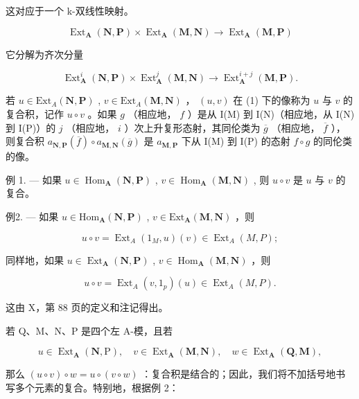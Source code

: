 这对应于一个 k-双线性映射。

\[
\operatorname{Ext} _ {\mathbf {A}} (\mathbf {N}, \mathbf {P}) \times \operatorname{Ext} _ {\mathbf {A}} (\mathbf {M}, \mathbf {N}) \rightarrow \operatorname{Ext} _ {\mathbf {A}} (\mathbf {M}, \mathbf {P})\tag{1}
\]

它分解为齐次分量

\[
\operatorname{Ext} _ {\mathbf {A}} ^ {i} (\mathbf {N}, \mathbf {P}) \times \operatorname{Ext} _ {\mathbf {A}} ^ {j} (\mathbf {M}, \mathbf {N}) \rightarrow \operatorname{Ext} _ {\mathbf {A}} ^ {i + j} (\mathbf {M}, \mathbf {P}).\tag{2}
\]

若 \(u \in \text{Ext}_A(\mathbf{N}, \mathbf{P})\) , \(v \in \text{Ext}_A(\mathbf{M}, \mathbf{N})\) ， \((u, v)\) 在 (1) 下的像称为 \(u\) 与 \(v\) 的复合积，记作 \(u \circ v\) 。如果 \(g\) （相应地， \(f\) ）是从 I(M) 到 I(N)（相应地，从 I(N) 到 I(P)）的 \(j\) （相应地， \(i\) ）次上升复形态射，其同伦类为 \(\overline{g}\) （相应地， \(\overline{f}\) ），则复合积 \(a_{\mathbf{N},\mathbf{P}}(\overline{f}) \circ a_{\mathbf{M},\mathbf{N}}(\overline{g})\) 是 \(a_{\mathbf{M},\mathbf{P}}\) 下从 I(M) 到 I(P) 的态射 \(f \circ g\) 的同伦类的像。

例 1. --- 如果 \(u \in \operatorname{Hom}_{\mathbf{A}}(\mathbf{N}, \mathbf{P})\) , \(v \in \operatorname{Hom}_{\mathbf{A}}(\mathbf{M}, \mathbf{N})\) , 则 \(u \circ v\) 是 \(u\) 与 \(v\) 的复合。

例2. --- 如果 \(u \in \mathrm{Hom}_{\mathbf{A}}(\mathbf{N}, \mathbf{P})\) , \(v \in \mathrm{Ext}_{\mathbf{A}}(\mathbf{M}, \mathbf{N})\) ，则

\[
u \circ v = \operatorname{Ext} _ {A} (1 _ {M}, u) (v) \in \operatorname{Ext} _ {A} (M, P);
\]

同样地，如果 \(u \in \operatorname{Ext}_{\mathbf{A}}(\mathbf{N}, \mathbf{P})\) , \(v \in \operatorname{Hom}_{\mathbf{A}}(\mathbf{M}, \mathbf{N})\) ，则

\[
u \circ v = \operatorname{Ext} _ {A} (v, 1 _ {p}) (u) \in \operatorname{Ext} _ {A} (M, P).
\]

这由 X，第 88 页的定义和注记得出。

若 Q、M、N、P 是四个左 A-模，且若

\[
u \in \operatorname{Ext} _ {\mathbf {A}} (\mathbf {N}, \mathrm{P}), \quad v \in \operatorname{Ext} _ {\mathbf {A}} (\mathbf {M}, \mathbf {N}), \quad w \in \operatorname{Ext} _ {\mathbf {A}} (\mathbf {Q}, \mathbf {M}),
\]

那么 \((u \circ v) \circ w = u \circ (v \circ w)\) ：复合积是结合的；因此，我们将不加括号地书写多个元素的复合。特别地，根据例 2：


